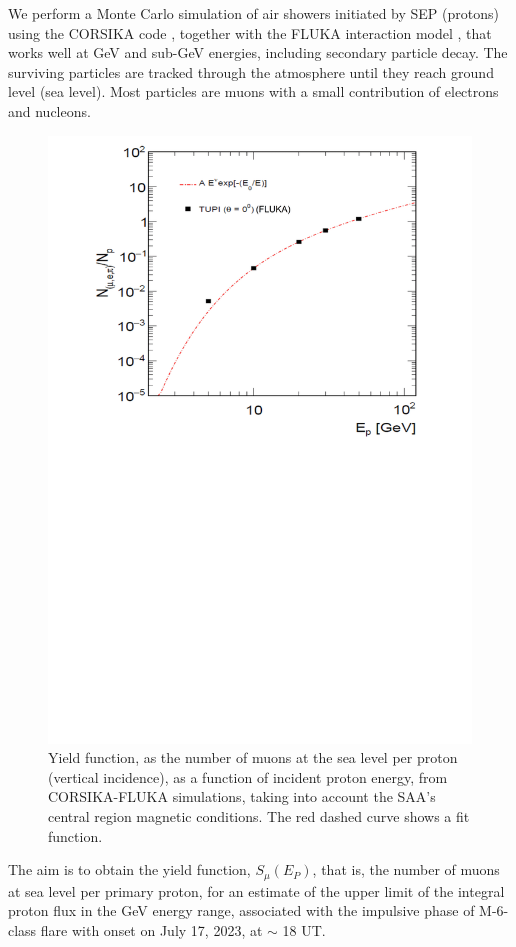 \documentclass[twocolumn]{aastex63}
\begin{document}
We perform a Monte Carlo simulation of air showers initiated by SEP (protons) using the CORSIKA code \citep{heck12}, together with the FLUKA interaction model \citep{batt08}, that works well at GeV and sub-GeV energies, including secondary particle decay. The surviving particles are tracked through the atmosphere until they reach ground level (sea level). Most particles are muons with a small contribution of electrons and nucleons.
\begin{figure}[]
\vspace*{-0.0cm}
\hspace*{-0.5cm}
\centering
\includegraphics[clip,width=0.5
\textwidth,height=0.6\textheight,angle=0.] {Fig6.png}
\vspace*{-7.0cm}
\caption{Yield function, as the number of muons at the sea level per
proton (vertical incidence), as a function of incident proton energy, from CORSIKA-FLUKA simulations, taking into account the SAA’s central region magnetic conditions.
The red dashed curve shows a fit function. 
}
\label{yield2}
\end{figure} 

The aim is to obtain the yield function, $S_{\mu}(E_P)$, that is, the number of muons at sea level per primary proton, for an estimate of the upper limit of the integral proton flux in the GeV energy range, associated with the impulsive phase of M-6-class flare with onset on July 17, 2023, at $\sim $ 18 UT. 
\end{document}
